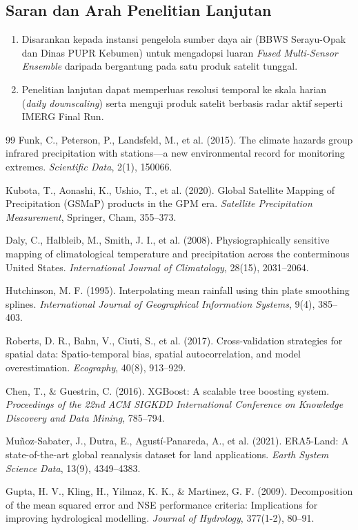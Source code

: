 \documentclass[11pt,a4paper,titlepage]{article}
\begin{document}
\subsection{Saran dan Arah Penelitian Lanjutan}
\begin{enumerate}
    \item Disarankan kepada instansi pengelola sumber daya air (BBWS Serayu-Opak dan Dinas PUPR Kebumen) untuk mengadopsi luaran \textit{Fused Multi-Sensor Ensemble} daripada bergantung pada satu produk satelit tunggal.
    \item Penelitian lanjutan dapat memperluas resolusi temporal ke skala harian (\textit{daily downscaling}) serta menguji produk satelit berbasis radar aktif seperti IMERG Final Run.
\end{enumerate}

\newpage
\begin{thebibliography}{99}
Funk, C., Peterson, P., Landsfeld, M., et al. (2015). The climate hazards group infrared precipitation with stations---a new environmental record for monitoring extremes. \textit{Scientific Data}, 2(1), 150066.

Kubota, T., Aonashi, K., Ushio, T., et al. (2020). Global Satellite Mapping of Precipitation (GSMaP) products in the GPM era. \textit{Satellite Precipitation Measurement}, Springer, Cham, 355--373.

Daly, C., Halbleib, M., Smith, J. I., et al. (2008). Physiographically sensitive mapping of climatological temperature and precipitation across the conterminous United States. \textit{International Journal of Climatology}, 28(15), 2031--2064.

Hutchinson, M. F. (1995). Interpolating mean rainfall using thin plate smoothing splines. \textit{International Journal of Geographical Information Systems}, 9(4), 385--403.

Roberts, D. R., Bahn, V., Ciuti, S., et al. (2017). Cross-validation strategies for spatial data: Spatio-temporal bias, spatial autocorrelation, and model overestimation. \textit{Ecography}, 40(8), 913--929.

Chen, T., \& Guestrin, C. (2016). XGBoost: A scalable tree boosting system. \textit{Proceedings of the 22nd ACM SIGKDD International Conference on Knowledge Discovery and Data Mining}, 785--794.

Mu\~noz-Sabater, J., Dutra, E., Agust\'i-Panareda, A., et al. (2021). ERA5-Land: A state-of-the-art global reanalysis dataset for land applications. \textit{Earth System Science Data}, 13(9), 4349--4383.

Gupta, H. V., Kling, H., Yilmaz, K. K., \& Martinez, G. F. (2009). Decomposition of the mean squared error and NSE performance criteria: Implications for improving hydrological modelling. \textit{Journal of Hydrology}, 377(1-2), 80--91.
\end{thebibliography}
\end{document}
